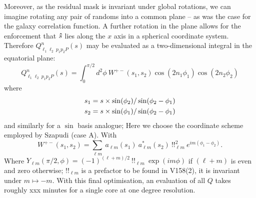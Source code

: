 \documentclass[useAMS,usenatbib]{mn2e}
\begin{document}
Moreover, as the residual mask is invariant under global rotations, we can imagine rotating any pair of randoms into a common plane -- as was the case for the galaxy correlation function.  A further rotation in the plane allows for the enforcement that $\boldsymbol{\hat} s$ lies along the $x$ axis in a spherical coordinate system.  Therefore $Q^{n}_{\ell_1 \ell_2 \ p_1 p_2 P}(s)$ may be evaluated as a two-dimensional integral in the equatorial plane:
\begin{equation}
Q^{n}_{\ell_1 \ell_2 \ p_1 p_2 P}(s) = %
\int^{\pi/2}_0 d^2 \phi \ W^{+-}(s_1, s_2) \cos (2 n_1 \phi_1) \cos (2 n_2 \phi_2) 
\end{equation}
where
\begin{align}
s_1 &= s \times \sin(\phi_2) / \sin(\phi_2 - \phi_1) \notag \\ 
s_2 &= s \times \sin(\phi_1) / \sin(\phi_2 - \phi_1)
\end{align}
and similarly for a $\sin$ basis analogue; Here we choose the coordinate scheme employed by Szapudi (case A).  With 
\begin{equation}
    W^{+-}(s_1, s_2) = \sum_{\ell m} \ a_{\ell m}(s_1) \ a^{*}_{\ell m}(s_2) \ \mathcal{!!}_{\ell m}^2 \ e^{i m (\phi_1 - \phi_2)}.  
\end{equation}
Where $Y_{\ell m}(\pi /2, \phi) = (-1)^{(\ell+m)/2} \ \mathcal{!!}_{\ell m} \ \exp( i m \phi)$ if $(\ell + m)$ is even and zero otherwise;  $\mathcal{!!}_{\ell m}$ is a prefactor to be found in V158(2), it is invariant under $m \mapsto -m$. 
With this final optimisation, an evaluation of all $Q$ takes roughly xxx minutes for a single core at one degree resolution.
\end{document}
